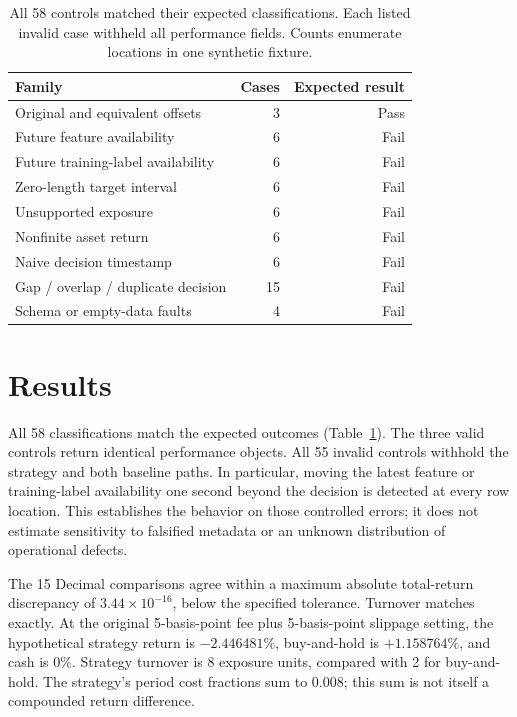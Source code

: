 \documentclass[sigconf,anonymous,nonacm]{acmart}
\begin{document}
\begin{table}[t]
\caption{All 58 controls matched their expected classifications. Each listed invalid case withheld all performance fields. Counts enumerate locations in one synthetic fixture.}
\label{tab:controls}
\centering
\begin{tabular}{lrr}
\toprule
Family & Cases & Expected result\\
\midrule
Original and equivalent offsets & 3 & Pass\\
Future feature availability & 6 & Fail\\
Future training-label availability & 6 & Fail\\
Zero-length target interval & 6 & Fail\\
Unsupported exposure & 6 & Fail\\
Nonfinite asset return & 6 & Fail\\
Naive decision timestamp & 6 & Fail\\
Gap / overlap / duplicate decision & 15 & Fail\\
Schema or empty-data faults & 4 & Fail\\
\bottomrule
\end{tabular}
\end{table}

\section{Results}
All 58 classifications match the expected outcomes (Table~\ref{tab:controls}). The three valid controls return identical performance objects. All 55 invalid controls withhold the strategy and both baseline paths. In particular, moving the latest feature or training-label availability one second beyond the decision is detected at every row location. This establishes the behavior on those controlled errors; it does not estimate sensitivity to falsified metadata or an unknown distribution of operational defects.

The 15 Decimal comparisons agree within a maximum absolute total-return discrepancy of $3.44\times10^{-16}$, below the specified tolerance. Turnover matches exactly. At the original 5-basis-point fee plus 5-basis-point slippage setting, the hypothetical strategy return is $-2.446481\%$, buy-and-hold is $+1.158764\%$, and cash is $0\%$. Strategy turnover is 8 exposure units, compared with 2 for buy-and-hold. The strategy's period cost fractions sum to $0.008$; this sum is not itself a compounded return difference.
\end{document}
